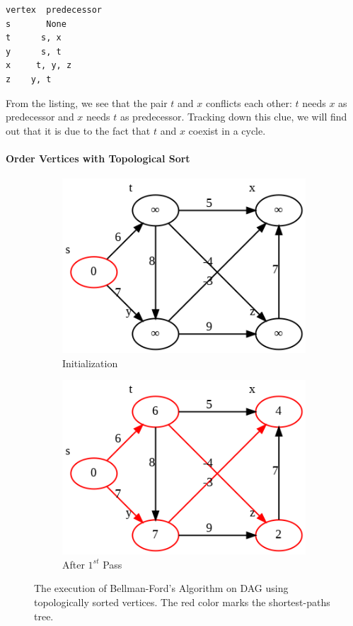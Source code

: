\documentclass[../main.tex]{subfiles}
\begin{document}
\begin{lstlisting}[numbers=none]
vertex  predecessor
s       None
t      s, x
y      s, t
x     t, y, z
z    y, t
\end{lstlisting}
From the listing, we see that the pair $t$ and $x$ conflicts each other: $t$ needs $x$ as predecessor and $x$ needs $t$ as predecessor. Tracking down this clue, we will find out that it is due to the fact that $t$ and $x$ coexist in a cycle. 
\paragraph{Order Vertices with Topological Sort} 
\begin{figure}[!ht]
    \centering
    \begin{subfigure}{.45\textwidth}
    \includegraphics[width=0.99\columnwidth]{fig/bellman_ford_0_dag.png}
    \caption{Initialization}
    \end{subfigure}
    \begin{subfigure}{.45\textwidth}
    \includegraphics[width=0.99\columnwidth]{fig/bellman_ford_1_dag.png}
    \caption{After $1^{st}$ Pass}
    \end{subfigure}
    \caption{The execution of Bellman-Ford's Algorithm on DAG using topologically sorted vertices. The red color marks the shortest-paths tree.}
    \label{fig:bellman_ford_2}
\end{figure}
\end{document}
